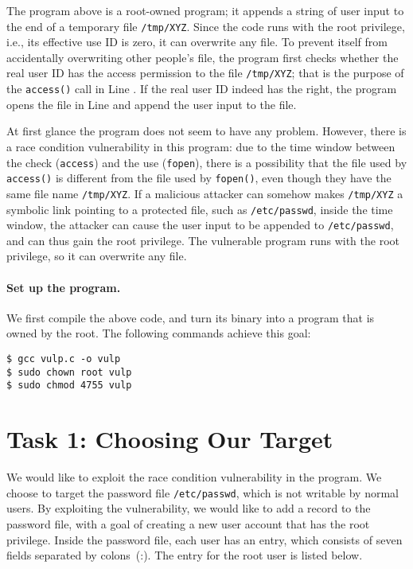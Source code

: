 The program above is a root-owned \setuid program;
it appends a string of user input to
the end of a temporary file {\tt /tmp/XYZ}. Since the code runs
with the root privilege, i.e., its effective use ID is zero, it 
can overwrite any file. To prevent itself from accidentally
overwriting other people's file, the program first 
checks whether the real user ID has the access permission to the file
{\tt /tmp/XYZ}; that is the purpose of the {\tt access()} call in Line
.  If the real user ID indeed has 
the right, the program opens the file in Line  and append the user
input to the file. 

At first glance the program does not seem to have any problem.
However, there is a race condition vulnerability in this program: due to the 
time window between the check ({\tt access}) and 
the use ({\tt fopen}), there is a possibility that the file used by
{\tt access()} is different from the file used by {\tt fopen()}, even
though they have the same file name {\tt /tmp/XYZ}.  If a malicious 
attacker can somehow makes {\tt /tmp/XYZ} a symbolic link pointing to
a protected file, such as \texttt{/etc/passwd}, inside the time window, 
the attacker can cause the user input
to be appended to \texttt{/etc/passwd}, and can thus gain the root
privilege. The vulnerable program runs with the root privilege, so
it can overwrite any file.


\paragraph{Set up the \setuid program.}
We first compile the above code, and turn its binary into a \setuid program that is owned by the
root. The following commands achieve this goal:

\begin{lstlisting}
$ gcc vulp.c -o vulp
$ sudo chown root vulp
$ sudo chmod 4755 vulp
\end{lstlisting}



\section{Task 1: Choosing Our Target}

We would like to exploit the race condition vulnerability in
the program.
We choose to target the password file \texttt{/etc/passwd}, which is not writable by
normal users. By exploiting the vulnerability, we would like to
add a record to the password file, with a goal of
creating a new user account that has the root privilege.
Inside the password file, each user has an entry, which consists of seven fields
separated by colons~(:). The entry for the root user is listed below.

